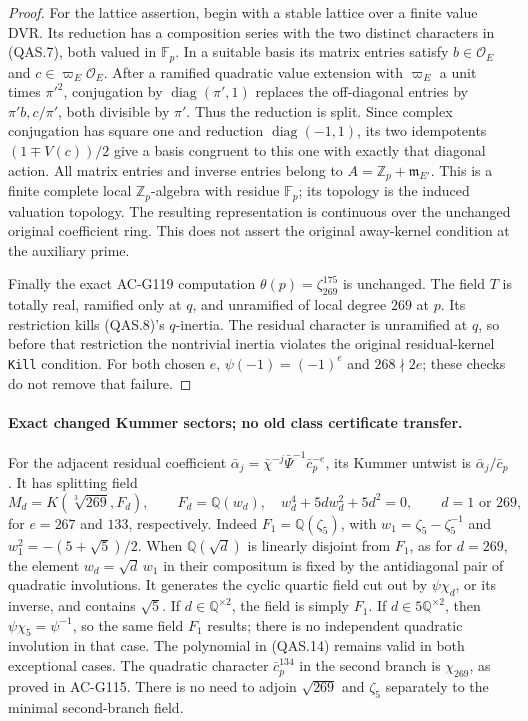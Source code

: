 \begin{proof}
For the lattice assertion, begin with a stable lattice over a
finite value DVR.  Its reduction has a composition series with
the two distinct characters in (QAS.7), both valued in
\(\mathbb F_p\).  In a suitable basis its matrix entries satisfy
\(b\in\mathcal O_E\) and \(c\in\varpi_E\mathcal O_E\).
After a ramified quadratic value extension with
\(\varpi_E\) a unit times \(\pi'^2\), conjugation by
\(\operatorname{diag}(\pi',1)\) replaces the off-diagonal
entries by \(\pi'b,c/\pi'\), both divisible by \(\pi'\).
Thus the reduction is split.  Since complex conjugation has
square one and reduction \(\operatorname{diag}(-1,1)\), its
two idempotents \((1\mp V(c))/2\) give a basis congruent to
this one with exactly that diagonal action.  All matrix entries
and inverse entries belong to
\(A=\mathbb Z_p+\mathfrak m_{E'}\).  This is a finite complete
local \(\mathbb Z_p\)-algebra with residue \(\mathbb F_p\);
its topology is the induced valuation topology.  The resulting
representation is continuous over the unchanged original
coefficient ring.  This does not assert the original away-kernel
condition at the auxiliary prime.

Finally the exact AC-G119 computation
\(\theta(p)=\zeta_{269}^{175}\) is unchanged.  The field
\(T\) is totally real, ramified only at \(q\), and unramified
of local degree \(269\) at \(p\).
Its restriction kills (QAS.8)'s \(q\)-inertia.
The residual character is unramified at \(q\), so before
that restriction the nontrivial inertia violates the original
residual-kernel \texttt{Kill} condition.
For both chosen \(e\), \(\psi(-1)=(-1)^e\) and
\(268\nmid2e\); these checks do not remove that failure.
\end{proof}

\paragraph{Exact changed Kummer sectors; no old class certificate transfer.}
For the adjacent residual coefficient
\(\bar\alpha_j=\bar\chi^{-j}\bar\Psi^{-1}\bar c_p^{-e}\), its Kummer
untwist is \(\bar\alpha_j/\bar c_p\).
It has splitting field
\[
 M_d=K(\sqrt[3]{269},F_d),\qquad
 F_d=\mathbb Q(w_d),\quad w_d^4+5d w_d^2+5d^2=0,
 \qquad d=1\text{ or }269,
 \tag{QAS.14}
\]
for \(e=267\) and \(133\), respectively.
Indeed \(F_1=\mathbb Q(\zeta_5)\), with
\(w_1=\zeta_5-\zeta_5^{-1}\) and
\(w_1^2=-(5+\sqrt5)/2\).  When
\(\mathbb Q(\sqrt d)\) is linearly disjoint from \(F_1\), as
for \(d=269\), the element \(w_d=\sqrt d\,w_1\) in their
compositum is fixed by the antidiagonal pair of quadratic
involutions.  It generates the cyclic quartic field cut out by
\(\psi\chi_d\), or its inverse, and contains \(\sqrt5\).
If \(d\in\mathbb Q^{\times2}\), the field is simply \(F_1\).
If \(d\in5\mathbb Q^{\times2}\), then
\(\psi\chi_5=\psi^{-1}\), so the same field \(F_1\) results;
there is no independent quadratic involution in that case.
The polynomial in (QAS.14) remains valid in both exceptional cases.
The quadratic character \(\bar c_p^{134}\) in the second branch
is \(\chi_{269}\), as proved in AC-G115.
There is no need to adjoin \(\sqrt{269}\) and \(\zeta_5\)
separately to the minimal second-branch field.

